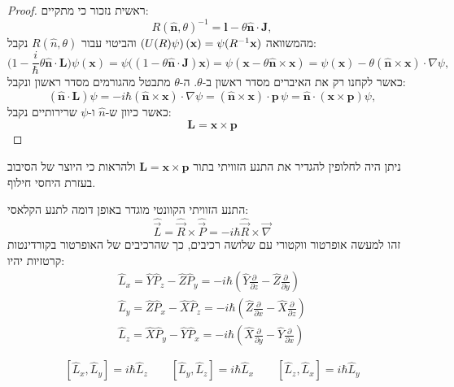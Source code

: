 \documentclass{tstextbook}
\begin{document}
\begin{proof}
ראשית נזכור כי מתקיים:
$$R({\hat{\mathbf{n}}},\theta)^{-1}=\mathbf{l}-\theta{\hat{\mathbf{n}}}\cdot\mathbf{J},$$
מהמשוואה \(\left(U(R)\psi\right)({\bf x})=\psi(R^{-1}{\bf x})\) והביטוי עבור \(R\left( \hat{n},\theta \right)\) נקבל:
$$\Big(1-{\frac{i}{\hbar}}\theta\mathbf{\hat{n}}\cdot\mathbf{L}\Big)\psi(\mathbf{x})=\psi\big((1-\theta\mathbf{\hat{n}}\cdot\mathbf{J})\mathbf{x}\big)=\psi(\mathbf{x}-\theta\mathbf{\hat{n}}\times\mathbf{x})=\psi(\mathbf{x})-\theta(\mathbf{\hat{n}}\times\mathbf{x})\cdot\nabla\psi,$$
כאשר לקחנו רק את האיברים מסדר ראשון ב-\(\theta\). ה-\(\theta\) מתבטל מהגורמים מסדר ראשון ונקבל:
$$({\hat{\mathbf{n}}}\cdot\mathbf{L})\psi=-i\hbar({\hat{\mathbf{n}}}{\times}\mathbf{x})\cdot\nabla\psi=({\hat{\mathbf{n}}}{\times}\mathbf{x})\cdot\mathbf{p}\,\psi={\hat{\mathbf{n}}}\cdot(\mathbf{x}{\times}\mathbf{p})\psi,$$
כאשר כיוון ש-\(\hat{n}\) ו-\(\psi\) שרירותיים נקבל:
$$\mathbf{L}=\mathbf{x}{\times}\mathbf{p}$$

\end{proof}
\begin{remark}
ניתן היה לחלופין להגדיר את התנע הזוויתי בתור \(\mathbf{L}=\mathbf{x}\times \mathbf{p}\) ולהראות כי היוצר של הסיבוב בעזרת היחסי חילוף.

\end{remark}
\begin{corollary}
התנע הזוויתי הקוונטי מוגדר באופן דומה לתנע הקלאסי:
$$\hat{\vec{L}}=\hat{\vec{R}}\times\hat{\vec{P}}=-i\hbar\hat{\vec{R}}\times\vec{\nabla}$$
זהו למעשה אופרטור ווקטורי עם שלושה רכיבים, כך שהרכיבים של האופרטור בקורדינטות קרטזיות יהיו:
\begin{gather*}\hat{L}_{x}=\hat{Y}\hat{P}_{z}-\hat{Z}\hat{P}_{y}=-i\hbar\left(\hat{Y}\frac{\partial}{\partial z}-\hat{Z}\frac{\partial}{\partial y}\right)\\ \hat{L}_{y}=\hat{Z}\hat{P}_{x}-\hat{X}\hat{P}_{z}=-i\hbar\left(\hat{Z}\frac{\partial}{\partial x}-\hat{X}\frac{\partial}{\partial z}\right)\\\hat{L}_{z}=\hat{X}\hat{P}_{y}-\hat{Y}\hat{P}_{x}=-i\hbar\left(\hat{X}\frac{\partial}{\partial y}-\hat{Y}\frac{\partial}{\partial x}\right) 
\end{gather*}

\end{corollary}
\begin{proposition}
$$[\hat{L}_{x},\hat{L}_{y}]=i\hbar\hat{L}_{z}\qquad[\hat{L}_{y},\hat{L}_{z}]=i\hbar\hat{L}_{x}\qquad[\hat{L}_{z},\hat{L}_{x}]=i\hbar\hat{L}_{y}$$

\end{proposition}
\end{document}
